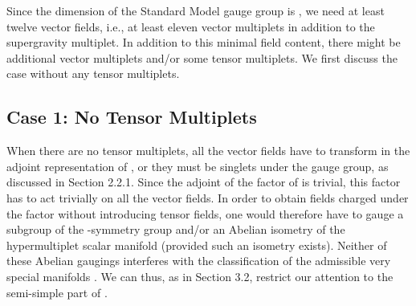 \documentclass[a4paper,11pt]{article}
\providecommand{\M}{\ensuremath{\mathcal{M}}}
\begin{document}
Since the dimension of the Standard Model gauge group is
\coordHE{}, we need at least twelve vector fields, i.e., at least
eleven vector multiplets in addition to the supergravity multiplet. In
addition to this minimal field content, there might be additional vector
multiplets and/or some tensor multiplets.  We first discuss the case
without any tensor multiplets.

\subsection{Case 1: No Tensor Multiplets}

When there are no tensor multiplets, all the vector fields have to
transform in the adjoint representation of \coordHE{}, or they must be
singlets under the gauge group, as discussed in Section 2.2.1. Since the
adjoint of the \coordHE{} factor of \coordHE{} is trivial, this \coordHE{} factor
has to act trivially on all the vector fields. In order to obtain fields
charged under the \coordHE{} factor without introducing tensor fields, one
would therefore have to gauge a \coordHE{} subgroup of the \coordHE{}-symmetry
group and/or an Abelian isometry of the hypermultiplet scalar manifold
\myHighlight{$\M_{Q}$}\coordHE{} (provided such an isometry exists). Neither of these Abelian
gaugings interferes with the classification of the admissible very special
manifolds \myHighlight{$\M_{VS}$}\coordHE{}. We can thus, as in Section 3.2, restrict our
attention to the semi-simple part of \coordHE{}. 
\end{document}
